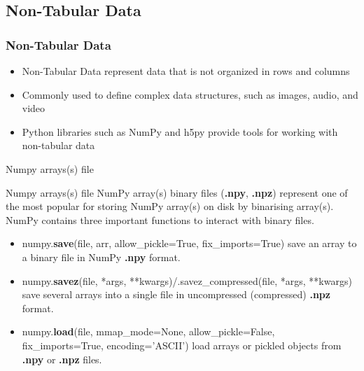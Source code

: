 \documentclass{beamer}
\begin{document}
    \subsection{Non-Tabular Data}
        \begin{frame}
        \frametitle{Non-Tabular Data}
        \begin{itemize}
            \item Non-Tabular Data represent data that is not organized in rows and columns
            \item Commonly used to define complex data structures, such as images, audio, and video
            \item Python libraries such as NumPy and h5py provide tools for working with non-tabular data
        \end{itemize}
    \end{frame}

    \begin{frame}[fragile]{Numpy arrays(s) file}
        \begin{block}{Numpy arrays(s) file}
            NumPy array(s) binary files (\textbf{.npy}, \textbf{.npz}) represent one of the most popular for storing NumPy array(s) on disk by binarising array(s). NumPy contains three important functions to interact with binary files.
            \begin{itemize}
                \item numpy.\textbf{save}(file, arr, allow\_pickle=True, fix\_imports=True) save an array to a binary file in NumPy \textbf{.npy} format.
                \item numpy.\textbf{savez}(file, *args, **kwargs)/.savez\_compressed(file, *args, **kwargs) save several arrays into a single file in uncompressed (compressed) \textbf{.npz} format.
                \item numpy.\textbf{load}(file, mmap\_mode=None, allow\_pickle=False, fix\_imports=True, encoding='ASCII') load arrays or pickled objects from \textbf{.npy} or \textbf{.npz} files.
            \end{itemize}
        \end{block}
    \end{frame}
\end{document}
